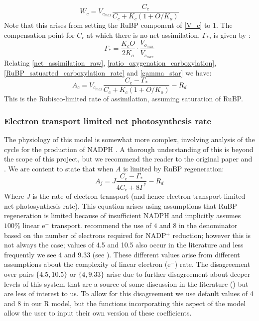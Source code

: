 \documentclass[11pt]{article} %
\begin{document}
\begin{equation} \label{RuBP_satuarted_carboxylation_rate}
W_c = V_{c_{max}} \frac{C_c}{C_c + K_c (1 + O / K_o)}
\end{equation}
Note that this arises from setting the RuBP component of \eqref{V_c} to 1.
The compensation point for $C_c$ at which there is no net assimilation, $\Gamma_*$, is given by \cite{Farquharbiochemicalmodelphotosynthetic1980}:
\begin{equation} \label{gamma_star}
\Gamma_* = \frac{K_c O}{2 K_o}\cdot \frac{V_{o_{max}}}{V_{c_{max}}}
\end{equation}
Relating \eqref{net_assimilation_raw}, \eqref{ratio_oxygenation_carboxylation}, \eqref{RuBP_satuarted_carboxylation_rate} and \eqref{gamma_star} we have:
\begin{equation} \label{rubisco_limited_photosynthesis}
A_c = V_{c_{max}} \frac{C_c - \Gamma_*}{C_c+K_c(1+O/K_o)}-R_d
\end{equation}
This is the Rubisco-limited rate of assimilation, assuming saturation of RuBP.

\subsubsection{Electron transport limited net photosynthesis rate}
The physiology of this model is somewhat more complex, involving analysis of the cycle for the production of NADPH \cite{Farquharbiochemicalmodelphotosynthetic1980}. A thorough understanding of this is beyond the scope of this project, but we recommend the reader to the original paper \cite{Farquharbiochemicalmodelphotosynthetic1980} and \citet{CaemmererBiochemicalmodelsleaf2000}. We are content to state that when $A$ is limited by RuBP regeneration:
\begin{equation} \label{RuBP_photosynthesis}
A_j = J\frac{C_c - \Gamma_*}{4C_c + 8\Gamma^*}-R_d
\end{equation}
Where $J$ is the rate of electron transport (and hence electron transport limited net photosynthesis rate). This equation arises using assumptions that RuBP regeneration is limited because of insufficient NADPH and implicitly assumes $100\%$  linear e$^-$ transport. \citet{SharkeyFittingphotosyntheticcarbon2007} recommend the use of $4$ and $8$ in the denominator based on the number of electrons required for NADP$^+$ reduction; however this is not always the case; values of 4.5 and 10.5 also occur in the literature and less frequently we see 4 and 9.33 (see \cite{SharkeyFittingphotosyntheticcarbon2007}\cite{YinUsingcombinedmeasurements2009}\cite{YinC3C4photosynthesis2009}). These different values arise from different assumptions about the complexity of linear electron (e$^-$) rate. The disagreement over pairs $\{4.5, 10.5\}$ or $\{4, 9.33\}$ arise due to further disagreement about deeper levels of this system that are a source of some discussion in the literature (\cite{CaemmererBiochemicalmodelsleaf2000}\cite{YinUsingcombinedmeasurements2009}) but are less of interest to us. To allow for this disagreement we use default values of 4 and 8 in our R model, but the functions incorporating this aspect of the model allow the user to input their own version of these coefficients.
\end{document}
